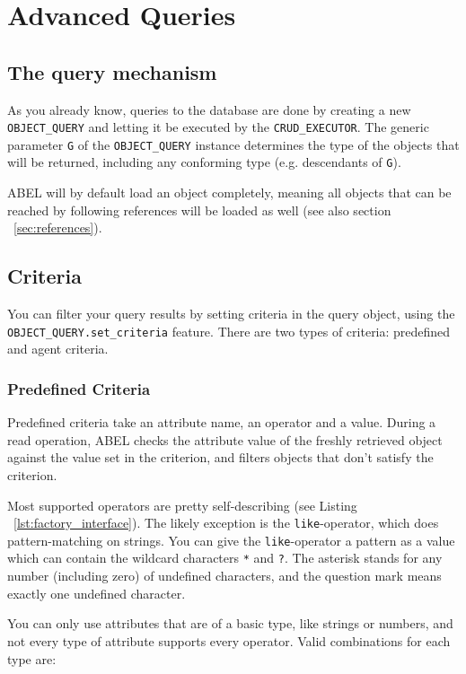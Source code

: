 \section{Advanced Queries}
\label{sec:query}

\subsection{The query mechanism}

As you already know, queries to the database are done by creating a new \lstinline!OBJECT_QUERY! and letting it be executed by the \lstinline!CRUD_EXECUTOR!.
The generic parameter \lstinline!G! of the \lstinline!OBJECT_QUERY! instance determines the type of the objects that will be returned, including any conforming type (e.g. descendants of \lstinline!G!).

ABEL will by default load an object completely, meaning all objects that can be reached by following references will be loaded as well (see also section ~\ref{sec:references}).


\subsection{Criteria}

You can filter your query results by setting criteria in the query object, using the \lstinline!OBJECT_QUERY.set_criteria! feature.
There are two types of criteria: predefined and agent criteria.

\subsubsection{Predefined Criteria}
Predefined criteria take an attribute name, an operator and a value. 
During a read operation, ABEL checks the attribute value of the freshly retrieved object against the value set in the criterion, and filters objects that don't satisfy the criterion.

Most supported operators are pretty self-describing (see Listing ~\ref{lst:factory_interface}).
The likely exception is the \lstinline!like!-operator, which does pattern-matching on strings.
You can give the \lstinline!like!-operator a pattern as a value which can contain the wildcard characters \lstinline!*! and \lstinline!?!.
The asterisk stands for any number (including zero) of undefined characters, and the question mark means exactly one undefined character.

You can only use attributes that are of a basic type, like strings or numbers, and not every type of attribute supports every operator. 
Valid combinations for each type are:

